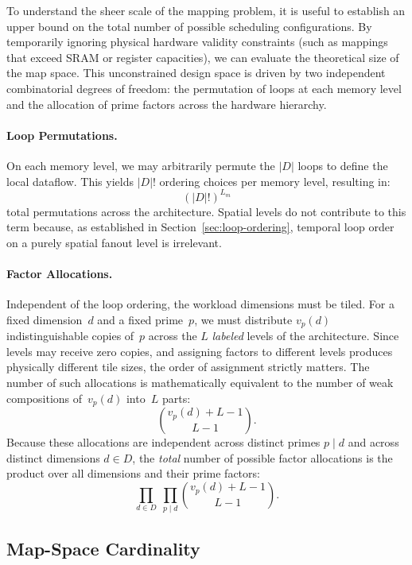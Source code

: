 To understand the sheer scale of the mapping problem, it is useful to establish an upper bound on the total number of possible scheduling configurations. By temporarily ignoring physical hardware validity constraints (such as mappings that exceed SRAM or register capacities), we can evaluate the theoretical size of the map space.  This unconstrained design space is driven by two independent combinatorial degrees of freedom: the permutation of loops at each memory level and the allocation of prime factors across the hardware hierarchy.

\paragraph{Loop Permutations.}
On each memory level, we may arbitrarily permute the $|D|$ loops to define the local dataflow. This yields $|D|!$ ordering choices per memory level, resulting in:
\[
  (|D|!)^{L_m}
\]
total permutations across the architecture. Spatial levels do not contribute to this term because, as established in Section~\ref{sec:loop-ordering}, temporal loop order on a purely spatial fanout level is irrelevant.

\paragraph{Factor Allocations.}
Independent of the loop ordering, the workload dimensions must be tiled. For a fixed dimension~$d$ and a fixed prime~$p$, we must distribute $v_p(d)$ indistinguishable copies of~$p$ across the $L$ \emph{labeled} levels of the architecture. Since levels may receive zero copies, and assigning factors to different levels produces physically different tile sizes, the order of assignment strictly matters. The number of such allocations is mathematically equivalent to the number of weak compositions of~$v_p(d)$ into~$L$ parts:
\[
  \binom{v_p(d) + L - 1}{L - 1}.
\]
Because these allocations are independent across distinct primes $p \mid d$ and across distinct dimensions $d \in D$, the \emph{total} number of possible factor allocations is the product over all dimensions and their prime factors:
\[
  \prod_{d \in D}\;\prod_{p \mid d}
    \binom{v_p(d) + L - 1}{L - 1}.
\]
\subsection{Map-Space Cardinality}
\label{sec:mapspace-card}

